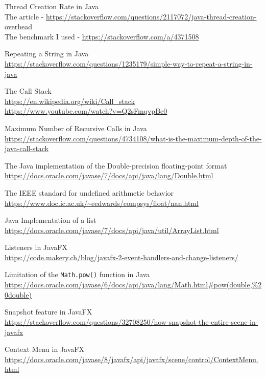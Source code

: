 \documentclass[../../main.tex]{subfiles}
\begin{document}
\begin{thebibliography}{9}
Thread Creation Rate in Java\\
The article - \url{https://stackoverflow.com/questions/2117072/java-thread-creation-overhead}\\
The benchmark I used - \url{https://stackoverflow.com/a/4371508}

Repeating a String in Java\\
\url{https://stackoverflow.com/questions/1235179/simple-way-to-repeat-a-string-in-java}

The Call Stack\\
\url{https://en.wikipedia.org/wiki/Call_stack}\\
\url{https://www.youtube.com/watch?v=Q2sFmqvpBe0}

Maximum Number of Recursive Calls in Java\\
\url{https://stackoverflow.com/questions/4734108/what-is-the-maximum-depth-of-the-java-call-stack}

The Java implementation of the Double-precision floating-point format\\
\url{https://docs.oracle.com/javase/7/docs/api/java/lang/Double.html}

The IEEE standard for undefined arithmetic behavior\\
\url{https://www.doc.ic.ac.uk/~eedwards/compsys/float/nan.html}

Java Implementation of a list\\
\url{https://docs.oracle.com/javase/7/docs/api/java/util/ArrayList.html}

Listeners in JavaFX\\
\url{https://code.makery.ch/blog/javafx-2-event-handlers-and-change-listeners/}

Limitation of the \texttt{Math.pow()} function in Java\\
\url{https://docs.oracle.com/javase/6/docs/api/java/lang/Math.html#pow(double,%20double)}

Snapshot feature in JavaFX\\
\url{https://stackoverflow.com/questions/32708250/how-snapshot-the-entire-scene-in-javafx}

Context Menu in JavaFX\\
\url{https://docs.oracle.com/javase/8/javafx/api/javafx/scene/control/ContextMenu.html}

\end{thebibliography}
\end{document}
